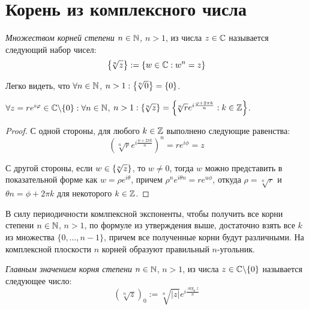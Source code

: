 \section{Корень из комплексного числа}

\begin{definition}
	\textit{Множеством корней степени $n \in \mathbb{N}$, $n > 1$}, из числа $z \in \mathbb{C}$ называется следующий набор чисел:
	\[\left\{\!\sqrt[n]{z}\right\} := \left\{w \in \mathbb{C}: w^n = z\right\}\]
\end{definition}

\begin{note}
	Легко видеть, что $\forall n \in \mathbb{N}$, $n > 1: \left\{\!\sqrt[n]{0}\right\} = \{0\}$.
\end{note}

\begin{proposition}
	$\forall z = re^{i\varphi} \in \mathbb{C} \backslash \{0\}: \forall n \in \mathbb{N}$, $n > 1: \left\{\!\sqrt[n]{z}\right\} = \left\{\!\sqrt[n]{r}e^{i\frac{\varphi + 2\pi k}{n}} : k \in \mathbb{Z}\right\}$.
\end{proposition}

\begin{proof}
	С одной стороны, для любого $k \in \mathbb{Z}$ выполнено следующие равенства:
	\[\left(\!\sqrt[n]{r}e^{i\frac{\phi + 2\pi k}{n}}\right)^n = re^{i\phi} = z\]
	
	С другой стороны, если $w \in \left\{\!\sqrt[n]{z}\right\}$, то $w \ne 0$, тогда $w$ можно представить в показательной форме как $w = \rho e^{i\theta}$, причем $\rho^ne^{i\theta n} = re^{u\phi}$, откуда $\rho = \sqrt[n]{r}$ и $\theta n = \phi + 2\pi k$ для некоторого $k \in \mathbb{Z}$.
\end{proof}

\begin{note}
	В силу периодичности комлпексной экспоненты, чтобы получить все корни степени $n \in \mathbb{N}$, $n > 1$, по формуле из утверждения выше, достаточно взять все $k$ из множества $\{0, \dotsc, n - 1\}$, причем все полученные корни будут различными. На комплексной плоскости $n$ корней образуют правильный $n$-угольник.
\end{note}

\begin{definition}
	\textit{Главным значением корня степени} $n \in \mathbb{N}$, $n > 1$, из числа $z \in \mathbb{C} \backslash \{0\}$ называется следующее число:
	\[\left(\!\sqrt[n]{z}\right)_0 := \sqrt[n]{|z|}e^{i\frac{\arg_0z}n}\]
\end{definition}